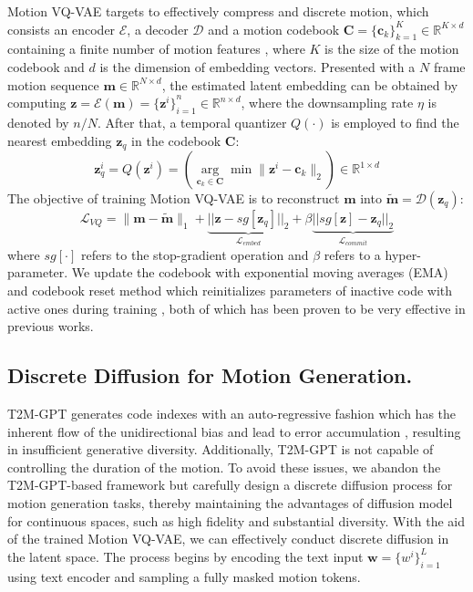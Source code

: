 \documentclass[letterpaper]{article} \usepackage{aaai24}
\begin{document}
Motion VQ-VAE \cite{oord2018neural,razavi2019generating, zhang2023t2mgpt} targets to effectively compress and discrete motion, 
which consists an encoder $ \mathcal{E} $, a decoder $ \mathcal{D} $ and a motion codebook $ \mathcal{\bm{C}} = {\{\bm{c}_k\}}_{k=1}^{K} \in \mathbb{R}^{K \times d} $ containing a finite number of motion features
, where $ K $ is the size of the motion codebook and $ d $ is the dimension of embedding vectors.
Presented with a $N$ frame motion sequence $ \bm{m} \in \mathbb{R}^{N \times d} $, the estimated latent embedding can be obtained by computing $ \bm{z} = \mathcal{E}(\bm{m}) = {\{\bm{z}^i\}}_{i=1}^{n} \in \mathbb{R}^{n \times d} $, where the downsampling rate 
$\eta$ is denoted by $ n/N $. After that, {a temporal quantizer} $ Q(\cdot) $ is employed to find the nearest embedding $\bm{z}_q$ in the codebook $\mathcal{\bm{C}}$:
\begin{equation}
	\bm{z}_q^i = Q\left( \bm{z}^i \right) =\left( \underset{\bm{c}_k\in \mathcal{\bm{C}}}\arg\min\|\bm{z}^i - \bm{c}_k\|_2 \right) \in \mathbb{R}^{1 \times d}
\end{equation}
The objective of training Motion VQ-VAE is  to reconstruct $\bm{m}$ into $\tilde{\bm{m}}=\mathcal{D}(\bm{z}_q)$:
\begin{equation}
    \mathcal{L}_{VQ} = \| \bm{m} - \tilde{\bm{m}} \|_1 + \underbrace{||\bm{z} - \mathit{sg}[\bm{z}_q]||_2}_{\mathcal{L}_{embed}} + \beta \underbrace{||\mathit{sg}[\bm{z}] - \bm{z}_q||_2}_{\mathcal{L}_{commit}}
\end{equation}
where $sg[\cdot]$ refers to the stop-gradient operation and $\beta$ refers to a hyper-parameter. 
We update the codebook with exponential moving averages (EMA) and codebook reset method which reinitializes parameters of inactive code with active ones during training \cite{williams2020hierarchical, zhang2023t2mgpt}, both of which has been proven to be very effective in previous works\cite{zhang2023t2mgpt,razavi2019generating}.

\subsection{Discrete Diffusion for Motion Generation.}
T2M-GPT \cite{zhang2023t2mgpt} generates code indexes with an auto-regressive fashion which has the inherent flow of the unidirectional bias and lead to error accumulation \cite{sheng2019woman}, resulting in insufficient generative diversity. Additionally, T2M-GPT is not capable of controlling the duration of the motion. To avoid these issues, we abandon the T2M-GPT-based framework but carefully design a discrete diffusion process for motion generation tasks, thereby maintaining the advantages of diffusion model for continuous spaces, such as high fidelity and substantial diversity.
With the aid of the trained Motion VQ-VAE, we can effectively conduct discrete diffusion in the latent space. The process begins by encoding the text input $ \bm{w} = \{w^i\}_{i=1}^{L} $ using text encoder and sampling a fully masked motion tokens.
\end{document}

